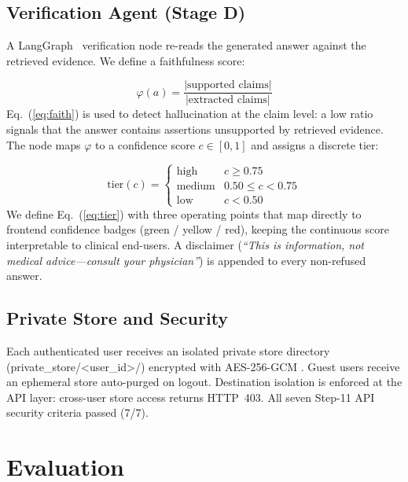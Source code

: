 \documentclass[conference]{IEEEtran}
\begin{document}
\subsection{Verification Agent (Stage D)}

A LangGraph~\cite{langgraph2024} verification node re-reads the generated
answer against the retrieved evidence. We define a faithfulness score:

\begin{equation}
\varphi(a) = \frac{|\text{supported claims}|}{|\text{extracted claims}|}
\label{eq:faith}
\end{equation}
Eq.~(\ref{eq:faith}) is used to detect hallucination at the claim level:
a low ratio signals that the answer contains assertions unsupported by
retrieved evidence. The node maps $\varphi$ to a confidence score
$c \in [0,1]$ and assigns a discrete tier:

\begin{equation}
\mathrm{tier}(c) =
\begin{cases}
\text{high}   & c \ge 0.75 \\
\text{medium} & 0.50 \le c < 0.75 \\
\text{low}    & c < 0.50
\end{cases}
\label{eq:tier}
\end{equation}
We define Eq.~(\ref{eq:tier}) with three operating points that map directly to
frontend confidence badges (green / yellow / red), keeping the continuous score
interpretable to clinical end-users. A disclaimer
(\emph{``This is information, not medical advice---consult your physician''}) is
appended to every non-refused answer.

\subsection{Private Store and Security}

Each authenticated user receives an isolated private store directory
(private\_store/<user\_id>/) encrypted with AES-256-GCM
\cite{nist2007aes}. Guest users receive an ephemeral store auto-purged on
logout. Destination isolation is enforced at the API layer: cross-user store
access returns HTTP~403. All seven Step-11 API security criteria passed (7/7).

\section{Evaluation}
\end{document}
